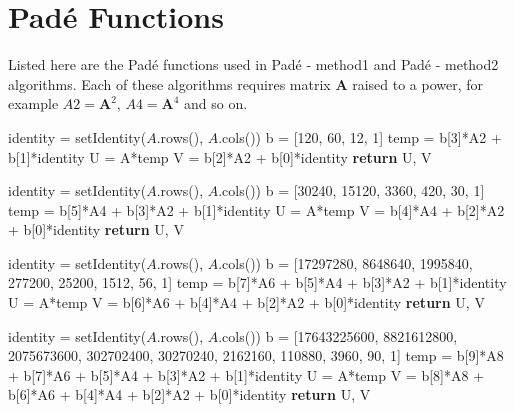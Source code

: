 \section{Pad\'e Functions}
\label{appen:padeFunctions}

Listed here are the Pad\'e functions used in Pad\'e - method1 and Pad\'e - method2 algorithms. Each of these algorithms requires matrix $\boldsymbol{A}$ raised to a power, for example $A2 = \boldsymbol{A}^{2}$, $A4 = \boldsymbol{A}^{4}$ and so on. 

\begin{algorithm}
	\caption{Pad\'e of Order 3} 
	\begin{algorithmic}[1]
		\State identity = setIdentity($A$.rows(), $A$.cols())
		\State b = [120, 60, 12, 1]
		\State temp = b[3]*A2 + b[1]*identity
		\State U = A*temp
        \State V = b[2]*A2 + b[0]*identity
        \State \textbf{return} U, V
        \EndProcedure
	\end{algorithmic} 
\end{algorithm}

\begin{algorithm}
	\caption{Pad\'e of Order 5} 
	\begin{algorithmic}[1]
		\State identity = setIdentity($A$.rows(), $A$.cols())
		\State b = [30240, 15120, 3360, 420, 30, 1]
		\State temp = b[5]*A4 + b[3]*A2 + b[1]*identity
		\State U = A*temp
        \State V = b[4]*A4 + b[2]*A2 + b[0]*identity
        \State \textbf{return} U, V
        \EndProcedure
	\end{algorithmic} 
\end{algorithm}

\begin{algorithm}
	\caption{Pad\'e of Order 7} 
	\begin{algorithmic}[1]
		\State identity = setIdentity($A$.rows(), $A$.cols())
		\State b = [17297280, 8648640, 1995840, 277200, 25200, 1512, 56, 1]
		\State temp = b[7]*A6 + b[5]*A4 + b[3]*A2 + b[1]*identity
		\State U = A*temp
        \State V = b[6]*A6 + b[4]*A4 + b[2]*A2 + b[0]*identity
        \State \textbf{return} U, V
        \EndProcedure
	\end{algorithmic} 
\end{algorithm}

\begin{algorithm}
	\caption{Pad\'e of Order 9} 
	\begin{algorithmic}[1]
		\State identity = setIdentity($A$.rows(), $A$.cols())
		\State b = [17643225600, 8821612800, 2075673600, 302702400, 30270240, 2162160, 110880, 3960, 90, 1]
		\State temp = b[9]*A8 + b[7]*A6 + b[5]*A4 + b[3]*A2 + b[1]*identity
		\State U = A*temp
        \State V = b[8]*A8 + b[6]*A6 + b[4]*A4 + b[2]*A2 + b[0]*identity
        \State \textbf{return} U, V
        \EndProcedure
	\end{algorithmic} 
\end{algorithm}

